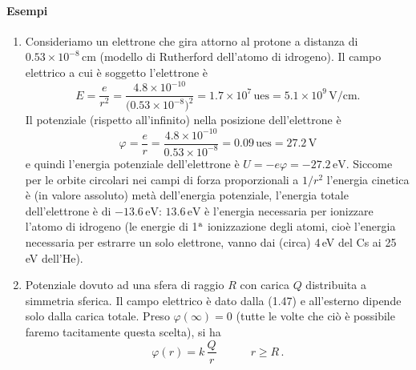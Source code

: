 \paragraph{Esempi}
\begin{enumerate}
\item Consideriamo un elettrone che gira attorno al protone a distanza di $0.53\times10^{-8}$\,cm (modello di Rutherford dell'atomo di idrogeno). Il campo elettrico a cui è soggetto l'elettrone è
\[
E=\frac{e}{r^2}=\frac{4.8\times10^{-10}}{\big(0.53\times10^{-8}\big)^2}=1.7\times10^7\,\mathrm{ues}=5.1\times10^9\,\mathrm{V/cm}.
\]
Il potenziale (rispetto all'infinito) nella posizione dell'elettrone è
\[
\varphi=\frac{e}{r}=\frac{4.8\times10^{-10}}{0.53\times10^{-8}}=0.09\,\mathrm{ues}=27.2\,\mathrm{V}
\]
e quindi l'energia potenziale dell'elettrone è $U=-e\varphi=-27.2\,\mathrm{eV}$. Siccome per le orbite circolari nei campi di forza proporzionali a $1/r^2$ l'energia cinetica è (in valore assoluto) metà dell'energia potenziale, l'energia totale dell'elettrone è di $-13.6\,\mathrm{eV}$: $13.6\,\mathrm{eV}$ è l'energia necessaria per ionizzare l'atomo di idrogeno (le energie di 1$^{\rm a}$ ionizzazione degli atomi, cioè l'energia necessaria per estrarre un solo elettrone, vanno dai (circa) 4\,eV del Cs ai 25\,eV dell'He).
\item Potenziale dovuto ad una sfera di raggio $R$ con carica $Q$ distribuita a simmetria sferica. Il campo elettrico è dato dalla (1.47) e all'esterno dipende solo dalla carica totale. Preso $\varphi(\infty)=0$ (tutte le volte che ciò è possibile faremo tacitamente questa scelta), si ha
\begin{equation}
\varphi(r)=k\,\frac{Q}{r}\qquad\quad r\ge R\,.
\tag{1.69}
\end{equation}


\end{enumerate}
